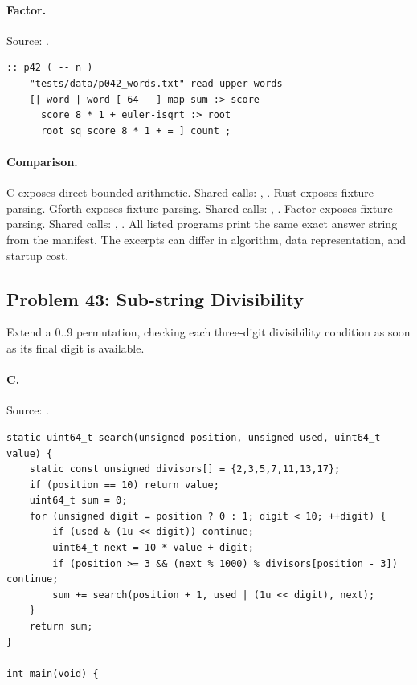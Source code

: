 \paragraph{Factor.} Source: .
\begin{lstlisting}
:: p42 ( -- n )
    "tests/data/p042_words.txt" read-upper-words
    [| word | word [ 64 - ] map sum :> score
      score 8 * 1 + euler-isqrt :> root
      root sq score 8 * 1 + = ] count ;
\end{lstlisting}

\paragraph{Comparison.}
C exposes direct bounded arithmetic. Shared calls: \texttt{}, \texttt{}. Rust exposes fixture parsing. Gforth exposes fixture parsing. Shared calls: \texttt{}, \texttt{}. Factor exposes fixture parsing. Shared calls: \texttt{}, \texttt{}.
All listed programs print the same exact answer string from the manifest. The excerpts can differ in algorithm, data representation, and startup cost.

\subsection{Problem 43: Sub-string Divisibility}
\label{walkthrough:p43}
Extend a 0..9 permutation, checking each three-digit divisibility condition as soon as its final digit is available.

\paragraph{C.} Source: .
\begin{lstlisting}
static uint64_t search(unsigned position, unsigned used, uint64_t value) {
    static const unsigned divisors[] = {2,3,5,7,11,13,17};
    if (position == 10) return value;
    uint64_t sum = 0;
    for (unsigned digit = position ? 0 : 1; digit < 10; ++digit) {
        if (used & (1u << digit)) continue;
        uint64_t next = 10 * value + digit;
        if (position >= 3 && (next % 1000) % divisors[position - 3]) continue;
        sum += search(position + 1, used | (1u << digit), next);
    }
    return sum;
}

int main(void) {
\end{lstlisting}

